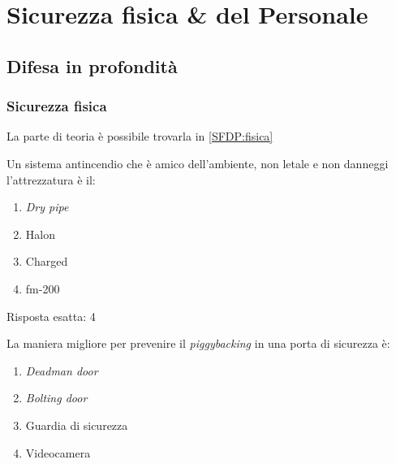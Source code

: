 \chapter{Sicurezza fisica \& del Personale}
\label{esSFDP}

\section{Difesa in profondità}

\subsection{Sicurezza fisica}
\label{esSFDP:fisica}

La parte di teoria è possibile trovarla in \ref{SFDP:fisica}


\begin{Exercise} [
  title={Quiz},
  label={esSFDP1}
  ]

  \Question Un sistema antincendio che è amico dell'ambiente, non letale e non 
danneggi l'attrezzatura è il:
\begin{enumerate}
 \item \textit{Dry pipe}
 \item Halon
 \item Charged
 \item fm-200
\end{enumerate}

\end{Exercise}


\begin{Answer} [
  ref={esSFDP1},
  number={1}
  ]

  \Question Risposta esatta: 4

\end{Answer}


\begin{Exercise} [
  title={Quiz},
  label={esSFDP2}
  ]

  \Question La maniera migliore per prevenire il \textit{piggybacking} in una 
porta di sicurezza è:
\begin{enumerate}
 \item \textit{Deadman door}
 \item \textit{Bolting door}
 \item Guardia di sicurezza
 \item Videocamera
\end{enumerate}

\end{Exercise}


